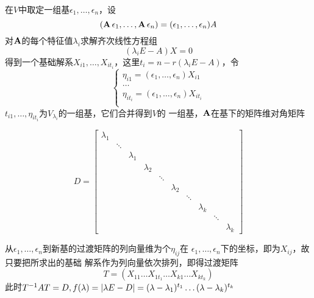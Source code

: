 \documentclass[11pt]{article}
\begin{document}
在\(V\)中取定一组基\(\epsilon_1,\dots,\epsilon_n\)，设
\begin{equation*}
(\operatorname{\textbf{A}}\epsilon_1,\dots,\operatorname{\textbf{A}}\epsilon_n)=(\epsilon_1,\dots,\epsilon_n)A
\end{equation*}
对\(\operatorname{\textbf{A}}\)的每个特征值\(\lambda_i\)求解齐次线性方程组
\begin{equation*}
(\lambda_i E-A)X=0
\end{equation*}
得到一个基础解系\(X_{i1},\dots,X_{it_i}\)，这里\(t_i=n-r(\lambda_i E-A)\)，令
\begin{equation*}
\begin{cases}
\eta_{i1}=(\epsilon_1,\dots,\epsilon_n)X_{i1}\\
\dots\\
\eta_{it_i}=(\epsilon_1,\dots,\epsilon_n)X_{it_i}\\
\end{cases}
\end{equation*}
\(t_{i1},\dots,\eta_{it_i}\)为\(V_{\lambda_i}\)的一组基，它们合并得到\(V\)的
一组基，\(\operatorname{\textbf{A}}\)在基下的矩阵维对角矩阵


\begin{equation*}
D=
\begin{bmatrix}
\lambda_1&&&&&&&&&\\
&\ddots&&&&&&&&\\
&&\lambda_1&&&&&&&\\
&&&\lambda_2&&&&&&\\
&&&&\ddots&&&&&\\
&&&&&\lambda_2&&&&\\
&&&&&&\ddots&&&\\
&&&&&&&\lambda_k&&\\
&&&&&&&&\ddots&\\
&&&&&&&&&\lambda_k
\end{bmatrix}
\end{equation*}

从\(\epsilon_1,\dots,\epsilon_n\)到新基的过渡矩阵的列向量维为个\(\eta_{ij}\)在
\(\epsilon_1,\dots,\epsilon_n\)下的坐标，即为\(X_{ij}\)，故只要把所求出的基础
解系作为列向量依次排列，即得过渡矩阵
\begin{equation*}
T=(X_{11}\dots X_{1t_1}\dots X_{k1}\dots X_{kt_k})
\end{equation*}
此时\(T^{-1}AT=D,f(\lambda)=\abs{\lambda
   E-D}=(\lambda-\lambda_1)^{t_1}\dots(\lambda-\lambda_k)^{t_k}\)
\end{document}
